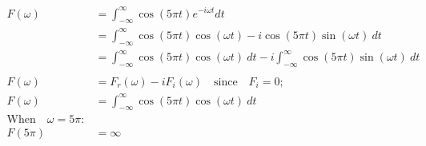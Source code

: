 \documentclass[preview]{standalone}
\begin{document}
\begin{align*}
F(\omega)&= \int_{-\infty}^{\infty} \cos{(5\pi t)}e^{-i\omega t} dt \\ &= \int_{-\infty}^{\infty} \cos{(5\pi t)}\cos{(\omega t)}-i\cos{(5\pi t)}\sin{(\omega t)} \ dt \\ &=\int_{-\infty}^{\infty} \cos{(5\pi t)}\cos{(\omega t)} \ dt - i\int_{-\infty}^{\infty} \cos{(5\pi t)}\sin{(\omega t)} \ dt \\ \\ F(\omega)&=F_{r}(\omega)-iF_{i}(\omega) \quad \textrm{since} \quad F_{i}=0; \\  F(\omega)&=\int_{-\infty}^{\infty} \cos{(5\pi t)}\cos{(\omega t)} \ dt \\  \textrm{When} \quad \omega=5\pi : \\ F(5\pi)&=\infty
\end{align*}
\end{document}
